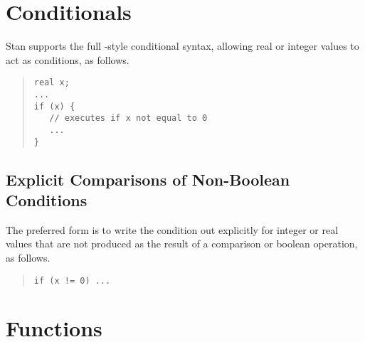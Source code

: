 \section{Conditionals}

Stan supports the full \Cpp-style conditional syntax,
allowing real or integer values to act as conditions, as follows.
%
\begin{quote}
\begin{Verbatim}[fontsize=\small]
real x;
...
if (x) {
   // executes if x not equal to 0
   ...
}
\end{Verbatim}
\end{quote}
%

\subsection{Explicit Comparisons of Non-Boolean Conditions}

The preferred form is to write the condition out explicitly for
integer or real values that are not produced as the result of a
comparison or boolean operation, as follows.
%
\begin{quote}
\begin{Verbatim}[fontsize=\small]
if (x != 0) ...
\end{Verbatim}
\end{quote}



\section{Functions}

